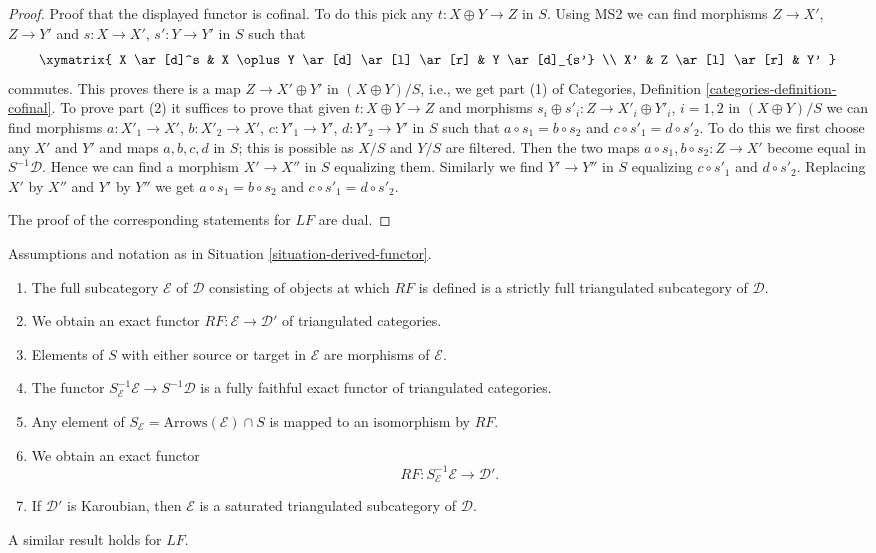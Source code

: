 \begin{proof}
\medskip\noindent
Proof that the displayed functor is cofinal.
To do this pick any $t : X \oplus Y \to Z$ in $S$.
Using MS2 we can find morphisms $Z \to X'$, $Z \to Y'$
and $s : X \to X'$, $s' : Y \to Y'$ in $S$ such that
$$
\xymatrix{
X \ar[d]^s & X \oplus Y \ar[d] \ar[l] \ar[r] & Y \ar[d]_{s'} \\
X' & Z \ar[l] \ar[r] & Y'
}
$$
commutes. This proves there is a map $Z \to X' \oplus Y'$ in
$(X \oplus Y)/S$, i.e., we get part (1) of Categories, Definition
\ref{categories-definition-cofinal}. To prove part (2) it suffices
to prove that given $t : X \oplus Y \to Z$ and morphisms
$s_i \oplus s'_i : Z \to X'_i \oplus Y'_i$, $i = 1, 2$ in $(X \oplus Y)/S$
we can find morphisms $a : X'_1 \to X'$, $b : X'_2 \to X'$,
$c : Y'_1 \to Y'$, $d : Y'_2 \to Y'$ in $S$ such that
$a \circ s_1 = b \circ s_2$ and $c \circ s'_1 = d \circ s'_2$.
To do this we first choose any $X'$ and $Y'$ and maps $a, b, c, d$
in $S$; this is possible as $X/S$ and $Y/S$ are filtered. Then the
two maps $a \circ s_1, b \circ s_2 : Z \to X'$ become equal in
$S^{-1}\mathcal{D}$. Hence we can find a morphism
$X' \to X''$ in $S$ equalizing them. Similarly we find $Y' \to Y''$ in $S$
equalizing $c \circ s'_1$ and $d \circ s'_2$. Replacing $X'$ by $X''$ and
$Y'$ by $Y''$ we get $a \circ s_1 = b \circ s_2$ and
$c \circ s'_1 = d \circ s'_2$.

\medskip\noindent
The proof of the corresponding statements for $LF$ are dual.
\end{proof}

\begin{proposition}
\label{proposition-derived-functor}
Assumptions and notation as in Situation \ref{situation-derived-functor}.
\begin{enumerate}
\item The full subcategory $\mathcal{E}$ of $\mathcal{D}$ consisting of
objects at which $RF$ is defined is a strictly full triangulated
subcategory of $\mathcal{D}$.
\item We obtain an exact functor
$RF : \mathcal{E} \longrightarrow \mathcal{D}'$
of triangulated categories.
\item Elements of $S$ with either source or target
in $\mathcal{E}$ are morphisms of $\mathcal{E}$.
\item The functor $S_\mathcal{E}^{-1}\mathcal{E} \to S^{-1}\mathcal{D}$
is a fully faithful exact functor of triangulated categories.
\item Any element of $S_\mathcal{E} = \text{Arrows}(\mathcal{E}) \cap S$
is mapped to an isomorphism by $RF$.
\item We obtain an exact functor
$$
RF : S_\mathcal{E}^{-1}\mathcal{E} \longrightarrow \mathcal{D}'.
$$
\item If $\mathcal{D}'$ is Karoubian, then $\mathcal{E}$ is a saturated
triangulated subcategory of $\mathcal{D}$.
\end{enumerate}
A similar result holds for $LF$.
\end{proposition}

